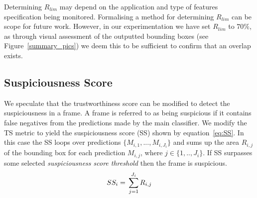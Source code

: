 Determining $R_{lim}$ may depend on the application and type of features specification being monitored. Formalising a method for determining $R_{lim}$ can be scope for future work. However, in our experimentation we have set $R_{lim}$ to $70\%$, as through visual assessment of the outputted bounding boxes (see Figure~\ref{summary_pics}) we deem this to be sufficient to confirm that an overlap exists.    


%



\subsection{Suspiciousness Score}
We speculate that the trustworthiness score can be modified to detect the suspiciousness in a frame. A frame is referred to as being suspicious if it contains false negatives from the predictions made by the main classifier. 
%
%
We modify the TS metric to yield the suspiciousness score (SS) shown by equation~\ref{eq:SS}. 
%
In this case the SS loops over predictions $\{M_{i,1},..., M_{i,J_i}\}$ and sums up the area $R_{i,j}$ of the bounding box for each prediction $M_{i,j}$, where $j\in\{1,..,J_i\}$. 
%
If SS surpasses some selected \textit{suspiciousness score threshold} then the frame is suspicious. 
\begin{equation}
    SS_i = \sideset{}{}\sum_{j=1}^{J_i} R_{i,j}
    \label{eq:SS}
\end{equation}

